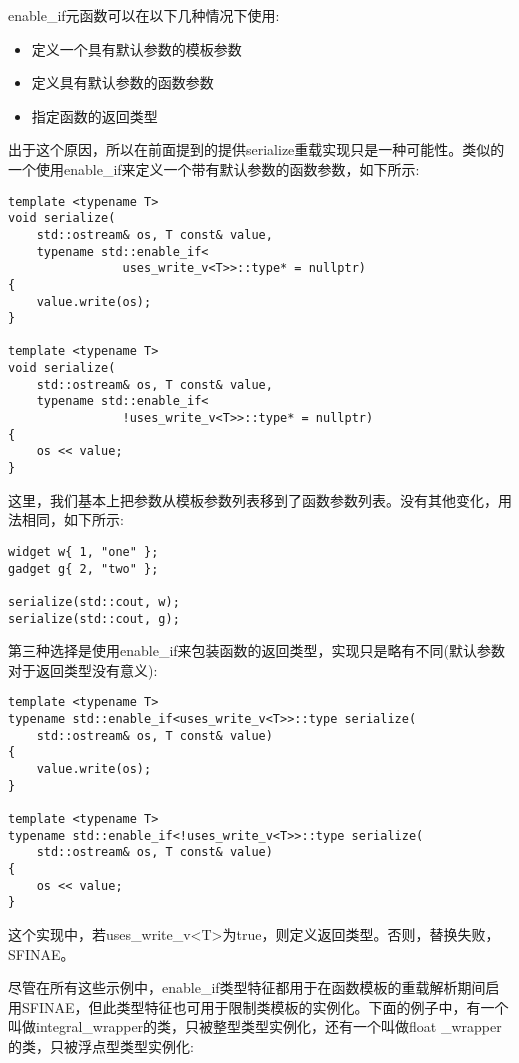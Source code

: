 enable\_if元函数可以在以下几种情况下使用:

\begin{itemize}
\item
定义一个具有默认参数的模板参数

\item
定义具有默认参数的函数参数

\item
指定函数的返回类型
\end{itemize}

出于这个原因，所以在前面提到的提供serialize重载实现只是一种可能性。类似的一个使用enable\_if来定义一个带有默认参数的函数参数，如下所示:

\begin{lstlisting}[style=styleCXX]
template <typename T>
void serialize(
	std::ostream& os, T const& value,
	typename std::enable_if<
				uses_write_v<T>>::type* = nullptr)
{
	value.write(os);
}

template <typename T>
void serialize(
	std::ostream& os, T const& value,
	typename std::enable_if<
				!uses_write_v<T>>::type* = nullptr)
{
	os << value;
}
\end{lstlisting}

这里，我们基本上把参数从模板参数列表移到了函数参数列表。没有其他变化，用法相同，如下所示:

\begin{lstlisting}[style=styleCXX]
widget w{ 1, "one" };
gadget g{ 2, "two" };

serialize(std::cout, w);
serialize(std::cout, g);
\end{lstlisting}

第三种选择是使用enable\_if来包装函数的返回类型，实现只是略有不同(默认参数对于返回类型没有意义):

\begin{lstlisting}[style=styleCXX]
template <typename T>
typename std::enable_if<uses_write_v<T>>::type serialize(
	std::ostream& os, T const& value)
{
	value.write(os);
}

template <typename T>
typename std::enable_if<!uses_write_v<T>>::type serialize(
	std::ostream& os, T const& value)
{
	os << value;
}
\end{lstlisting}

这个实现中，若uses\_write\_v<T>为true，则定义返回类型。否则，替换失败，SFINAE。

尽管在所有这些示例中，enable\_if类型特征都用于在函数模板的重载解析期间启用SFINAE，但此类型特征也可用于限制类模板的实例化。下面的例子中，有一个叫做integral\_wrapper的类，只被整型类型实例化，还有一个叫做float \_wrapper的类，只被浮点型类型实例化:

